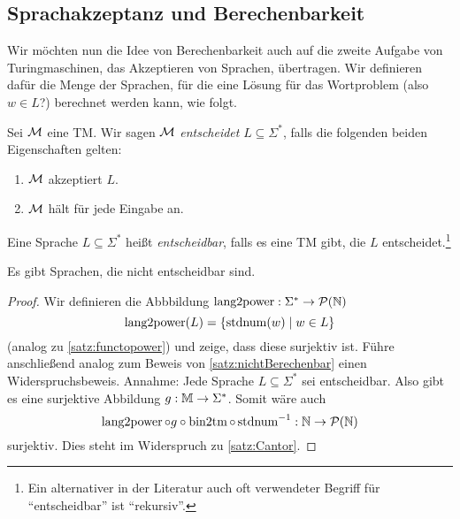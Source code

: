 \subsection{Sprachakzeptanz und Berechenbarkeit}
Wir möchten nun die Idee von Berechenbarkeit auch auf die zweite Aufgabe von Turingmaschinen, das Akzeptieren von Sprachen, übertragen.
Wir definieren dafür die Menge der Sprachen, für die eine Lösung für das Wortproblem (also $w\in L$?) berechnet werden kann, wie folgt.

\begin{Def}[name={[Entscheidbarkeit]}]\label{def:entscheidbarkeit}
	Sei $\mathcal{M}$ eine \ac{TM}.
	Wir sagen $\mathcal{M}$ \emph{entscheidet} $L\subseteq\Sigma^*$, falls die folgenden beiden Eigenschaften gelten:
	\begin{enumerate}
		\item $\mathcal{M}$ akzeptiert $L$.
		\item $\mathcal{M}$ hält für jede Eingabe an.
	\end{enumerate}
	
	Eine Sprache $L\subseteq\Sigma^*$ heißt \emph{entscheidbar}, falls es eine \ac{TM} gibt, die $L$ entscheidet.\footnote{
		Ein alternativer in der Literatur auch oft verwendeter Begriff für "`entscheidbar"' ist "`rekursiv"'.}
	
\end{Def}


\begin{Satz}[name={[nicht entscheidbare Sprache]}]\label{satz:NichtEntscheidbareSprache}
	Es gibt Sprachen, die nicht entscheidbar sind.
\end{Satz}

\begin{proof}
	Wir definieren die Abbbildung \mbox{$\operatorname{lang2power}:\Sigma^*\rightarrow \mathcal{P}(\mathbb{N})$}
	$$\operatorname{lang2power}(L)=\{\operatorname{stdnum}(w) \mid w\in L\}$$
	(analog zu \autoref{satz:functopower}) und zeige, dass diese surjektiv ist.
	Führe anschließend analog zum Beweis von \autoref{satz:nichtBerechenbar} einen Widerspruchsbeweis.
	Annahme: Jede Sprache $L\subseteq\Sigma^*$ sei entscheidbar. Also gibt es eine surjektive Abbildung $g:\mathbb{M}\rightarrow\Sigma^*$.
	Somit wäre auch 
	$$\operatorname{lang2power}\circ g \circ\operatorname{bin2tm}\circ \operatorname{stdnum}^{-1}:\mathbb{N}\rightarrow\mathcal{P}(\mathbb{N})$$
	surjektiv.
	Dies steht im Widerspruch zu \autoref{satz:Cantor}.
	\index{$\langtopower$}
\end{proof}


